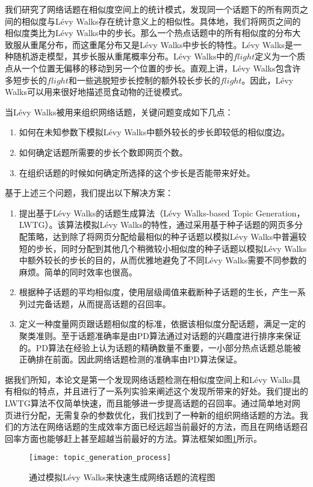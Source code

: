 我们研究了网络话题在相似度空间上的统计模式，发现同一个话题下的所有网页之间的相似度与L\'evy Walks存在统计意义上的相似性\citep{perkins2014ascaling}。具体地，我们将网页之间的相似度类比为L\'evy Walks中的步长。那么一个热点话题中的所有相似度的分布大致服从重尾分布，而这重尾分布又是L\'evy Walks中步长的特性。L\'evy Walks\citep{viswanathan2001levy,rhee2011levywalk}是一种随机游走模型，其步长服从重尾概率分布。L\'evy Walks中的$flight$定义为一个质点从一个位置无偏移的移动到另一个位置的步长。直观上讲，L\'evy Walks包含许多短步长的$flight$和一些逃脱短步长控制的额外较长步长的$flight$。因此，L\'evy Walks可以用来很好地描述觅食动物的迁徙模式。

当L\'evy Walks被用来组织网络话题，关键问题变成如下几点：
\begin{enumerate}
\renewcommand{\labelenumi}{\theenumi)}
    \item 如何在未知参数下模拟L\'evy Walks中额外较长的步长即较低的相似度边。
    \item 如何确定话题所需要的步长个数即网页个数。
    \item 在组织话题的时候如何确定所选择的这个步长是否能带来好处。
\end{enumerate}
基于上述三个问题，我们提出以下解决方案：
\begin{enumerate}
\renewcommand{\labelenumi}{\theenumi)}
    \item 提出基于L\'{e}vy Walks的话题生成算法（L\'evy Walks-based Topic Generation，LWTG）。该算法模拟L\'evy Walks的特性，通过采用基于种子话题的网页多分配策略，达到除了将网页分配给最相似的种子话题以模拟L\'evy Walks中普遍较短的步长，同时分配到其他几个稍微较小相似度的种子话题以模拟L\'evy Walks中额外较长的步长的目的，从而优雅地避免了不同L\'evy Walks需要不同参数的麻烦。简单的同时效率也很高。
    \item 根据种子话题的平均相似度，使用层级阈值来截断种子话题的生长，产生一系列过完备话题，从而提高话题的召回率。
    \item 定义一种度量网页跟话题相似度的标准，依据该相似度分配话题，满足一定的聚类准则。至于话题准确率是由PD算法\citep{pang-2013-unsupervised,pang-tao-2016-lpd,pang-tao-2018-neurocomputing}通过对话题的兴趣度进行排序来保证的。PD算法在经验上认为话题的精确数量不重要，一小部分热点话题总能被正确排在前面。因此网络话题检测的准确率由PD算法保证。
\end{enumerate}

据我们所知，本论文是第一个发现网络话题检测在相似度空间上和L\'evy Walks具有相似的特点，并且进行了一系列实验来阐述这个发现所带来的好处。我们提出的LWTG算法不仅简单快速，而且能够进一步提高话题的召回率。通过简单地对网页进行分配，无需复杂的参数优化，我们找到了一种新的组织网络话题的方法。我们的方法在网络话题的生成效率方面已经远超当前最好的方法，而且在网络话题召回率方面也能够赶上甚至超越当前最好的方法。算法框架如图\ref{fig:topic_generation_process}所示。
\begin{figure}[!htbp]
    \centering
    \texttt{[image: topic\_generation\_process]}
    \caption{通过模拟L\'evy Walks来快速生成网络话题的流程图}
    \label{fig:topic_generation_process}
\end{figure}

